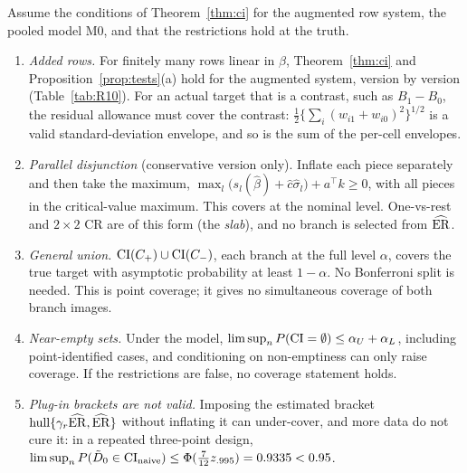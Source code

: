 \begin{theorem}\label{thm:R10}
Assume the conditions of Theorem~\ref{thm:ci} for the augmented row system, the
pooled model M0, and that the restrictions hold at the truth.
\begin{enumerate}[label=(\alph*)]
\item \emph{Added rows.} For finitely many rows linear in $\beta$,
Theorem~\ref{thm:ci} and Proposition~\ref{prop:tests}(a) hold for the augmented
system, version by version (Table~\ref{tab:R10}). For an actual target that is a
contrast, such as $B_1-B_0$, the residual allowance must cover the contrast:
$\tfrac12\{\sum_i(w_{i1}+w_{i0})^2\}^{1/2}$ is a valid standard-deviation envelope,
and so is the sum of the per-cell envelopes.
\item \emph{Parallel disjunction} (conservative version only). Inflate each piece
separately and then take the maximum,
$\max_l\big(s_l(\hat\beta)+\hat c\hat\sigma_l\big)+a^\top k\ge0$, with all pieces in the
critical-value maximum. This covers at the nominal level. One-vs-rest and
$2\times2$ CR are of this form (the \emph{slab}), and no branch is selected from
$\widehat{\mathrm{ER}}$.
\item \emph{General union.} $\mathrm{CI}(C_+)\cup\mathrm{CI}(C_-)$, each branch at the full level
$\alpha$, covers the true target with asymptotic probability at least $1-\alpha$. No
Bonferroni split is needed. This is point coverage; it gives no simultaneous
coverage of both branch images.
\item \emph{Near-empty sets.} Under the model,
$\limsup_nP(\mathrm{CI}=\emptyset)\le\alpha_U+\alpha_L$, including point-identified cases,
and conditioning on non-emptiness can only raise coverage. If the restrictions are
false, no coverage statement holds.
\item \emph{Plug-in brackets are not valid.} Imposing the estimated bracket
$\operatorname{hull}\{\gamma_r\widehat{\mathrm{ER}},\widehat{\mathrm{ER}}\}$ without inflating it can under-cover,
and more data do not cure it: in a repeated three-point design,
$\limsup_nP(\tilde D_0\in\mathrm{CI}_{\rm naive})\le\Phi(\tfrac7{12}z_{.995})=0.9335<0.95$.
\end{enumerate}
\end{theorem}

